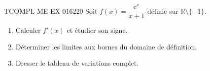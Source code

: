 \begin{exercice}{TCOMPL-ME-EX-016}{2}{20}
Soit $f(x) = \dfrac{\mathrm{e}^x}{x+1}$ définie sur $\mathbb{R} \setminus \{-1\}$.
\begin{enumerate}
  \item Calculer $f'(x)$ et étudier son signe.
  \item Déterminer les limites aux bornes du domaine de définition.
  \item Dresser le tableau de variations complet.
\end{enumerate}

\end{exercice}
